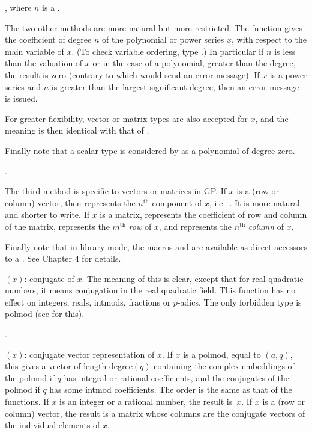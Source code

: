 , where $n$ is a .

The two other methods are more natural but more restricted. The function
 gives the coefficient of degree $n$ of the polynomial
or power series $x$, with respect to the main variable of $x$. (To check
variable ordering, type .) In particular
if $n$ is less than the valuation of
$x$ or in the case of a polynomial, greater than the degree, the result is
zero (contrary to  which would send an error message). If $x$ is
a power series and $n$ is greater than the largest significant degree, then
an error message is issued.

For greater flexibility, vector or matrix types are also accepted for $x$,
and the meaning is then identical with that of .

Finally note that a scalar type is considered by  as a
polynomial of degree zero.

.

The third method is specific to vectors or matrices in GP. If $x$ is a
(row or column) vector, then  represents the $n^{\text{th}}$
component of $x$, i.e.~. It is more natural and shorter to
write. If $x$ is a matrix,  represents the coefficient of
row  and column  of the matrix,  represents
the $m^{\text{th}}$ \emph{row} of $x$, and  represents
the $n^{\text{th}}$ \emph{column} of $x$.

Finally note that in library mode, the macros  and 
are available as direct accessors to a . See Chapter 4 for
details.

$(x)$: conjugate of $x$. The meaning of this
is clear, except that for real quadratic numbers, it means conjugation in the
real quadratic field. This function has no effect on integers, reals,
intmods, fractions or $p$-adics. The only forbidden type is polmod
(see  for this).

.

$(x)$: conjugate vector representation of $x$. If $x$ is a
polmod, equal to $(a,q)$, this gives a vector of length
$\text{degree}(q)$ containing the complex embeddings of the polmod if $q$ has
integral or rational coefficients, and the conjugates of the polmod if $q$
has some intmod coefficients. The order is the same as that of the
 functions. If $x$ is an integer or a rational number, the
result is~$x$. If $x$ is a (row or column) vector, the result is a matrix
whose columns are the conjugate vectors of the individual elements of $x$.

